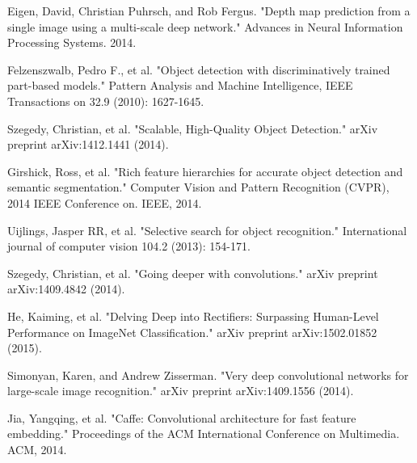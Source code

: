 \documentclass[journal]{IEEEtran}
\begin{document}
\begin{thebibliography}{1}
Eigen, David, Christian Puhrsch, and Rob Fergus. "Depth map prediction from a single image using a multi-scale deep network." Advances in Neural Information Processing Systems. 2014.

Felzenszwalb, Pedro F., et al. "Object detection with discriminatively trained part-based models." Pattern Analysis and Machine Intelligence, IEEE Transactions on 32.9 (2010): 1627-1645.

Szegedy, Christian, et al. "Scalable, High-Quality Object Detection." arXiv preprint arXiv:1412.1441 (2014).

Girshick, Ross, et al. "Rich feature hierarchies for accurate object detection and semantic segmentation." Computer Vision and Pattern Recognition (CVPR), 2014 IEEE Conference on. IEEE, 2014.

Uijlings, Jasper RR, et al. "Selective search for object recognition." International journal of computer vision 104.2 (2013): 154-171.

Szegedy, Christian, et al. "Going deeper with convolutions." arXiv preprint arXiv:1409.4842 (2014).

He, Kaiming, et al. "Delving Deep into Rectifiers: Surpassing Human-Level Performance on ImageNet Classification." arXiv preprint arXiv:1502.01852 (2015).

Simonyan, Karen, and Andrew Zisserman. "Very deep convolutional networks for large-scale image recognition." arXiv preprint arXiv:1409.1556 (2014).

Jia, Yangqing, et al. "Caffe: Convolutional architecture for fast feature embedding." Proceedings of the ACM International Conference on Multimedia. ACM, 2014.

\end{thebibliography}
\end{document}
